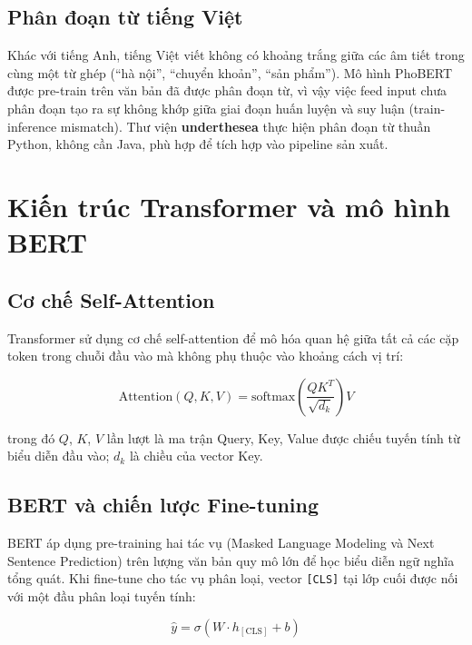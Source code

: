 \documentclass[12pt, a4paper]{report}
\begin{document}
\subsection{Phân đoạn từ tiếng Việt}

Khác với tiếng Anh, tiếng Việt viết không có khoảng trắng giữa các âm tiết
trong cùng một từ ghép (``hà nội'', ``chuyển khoản'', ``sản phẩm'').
Mô hình PhoBERT được pre-train trên văn bản đã được phân đoạn từ,
vì vậy việc feed input chưa phân đoạn tạo ra sự không khớp giữa
giai đoạn huấn luyện và suy luận (train-inference mismatch).
Thư viện \textbf{underthesea} \cite{underthesea} thực hiện phân đoạn từ
thuần Python, không cần Java, phù hợp để tích hợp vào pipeline sản xuất.

\section{Kiến trúc Transformer và mô hình BERT}

\subsection{Cơ chế Self-Attention}

Transformer \cite{vaswani2017attention} sử dụng cơ chế self-attention
để mô hóa quan hệ giữa tất cả các cặp token trong chuỗi đầu vào
mà không phụ thuộc vào khoảng cách vị trí:

\begin{equation}
  \text{Attention}(Q, K, V) = \text{softmax}\!\left(\frac{QK^T}{\sqrt{d_k}}\right)V
\end{equation}

trong đó $Q$, $K$, $V$ lần lượt là ma trận Query, Key, Value
được chiếu tuyến tính từ biểu diễn đầu vào; $d_k$ là chiều
của vector Key.

\subsection{BERT và chiến lược Fine-tuning}

BERT \cite{devlin2019bert} áp dụng pre-training hai tác vụ
(Masked Language Modeling và Next Sentence Prediction) trên lượng văn bản
quy mô lớn để học biểu diễn ngữ nghĩa tổng quát. Khi fine-tune cho
tác vụ phân loại, vector \texttt{[CLS]} tại lớp cuối được nối với
một đầu phân loại tuyến tính:

\begin{equation}
  \hat{y} = \sigma(W \cdot h_{[\text{CLS}]} + b)
\end{equation}
\end{document}
